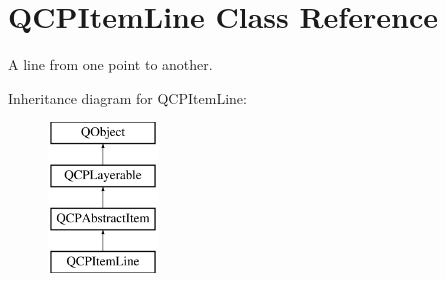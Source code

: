 \hypertarget{classQCPItemLine}{\section{Q\-C\-P\-Item\-Line Class Reference}
\label{classQCPItemLine}
}


A line from one point to another.  


Inheritance diagram for Q\-C\-P\-Item\-Line\-:\begin{figure}[H]
\begin{center}
\leavevmode
\includegraphics[height=4.000000cm]{classQCPItemLine}
\end{center}
\end{figure}
